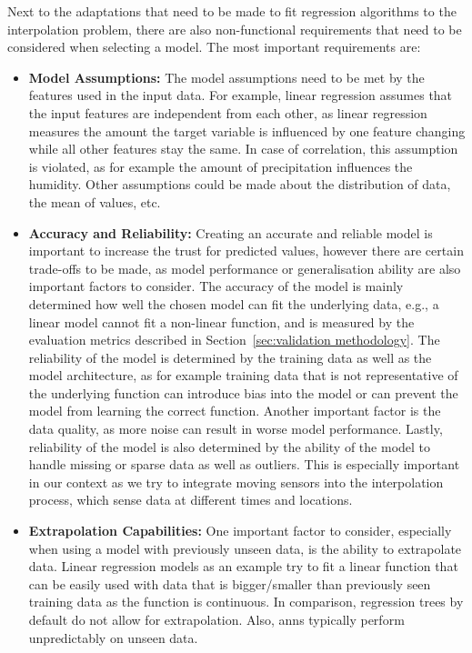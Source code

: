 Next to the adaptations that need to be made to fit regression algorithms to the interpolation problem, there are also non-functional requirements that need to be considered when selecting a model. The most important requirements are:

\begin{itemize}
    \item \textbf{Model Assumptions:} The model assumptions need to be met by the features used in the input data. For example, linear regression assumes that the input features are independent from each other, as linear regression measures the amount the target variable is influenced by one feature changing while all other features stay the same. In case of correlation, this assumption is violated, as for example the amount of precipitation influences the humidity. Other assumptions could be made about the distribution of data, the mean of values, etc.
    \item \textbf{Accuracy and Reliability:} Creating an accurate and reliable model is important to increase the trust for predicted values, however there are certain trade-offs to be made, as model performance or generalisation ability are also important factors to consider.
    The accuracy of the model is mainly determined how well the chosen model can fit the underlying data, e.g., a linear model cannot fit a non-linear function, and is measured by the evaluation metrics described in Section~\ref{sec:validation methodology}.
    The reliability of the model is determined by the training data as well as the model architecture, as for example training data that is not representative of the underlying function can introduce bias into the model or can prevent the model from learning the correct function. Another important factor is the data quality, as more noise can result in worse model performance. Lastly, reliability of the model is also determined by the ability of the model to handle missing or sparse data as well as outliers. This is especially important in our context as we try to integrate moving sensors into the interpolation process, which sense data at different times and locations.
    \item \textbf{Extrapolation Capabilities:} One important factor to consider, especially when using a model with previously unseen data, is the ability to extrapolate data. Linear regression models as an example try to fit a linear function that can be easily used with data that is bigger/smaller than previously seen training data as the function is continuous. In comparison, regression trees by default do not allow for extrapolation. Also, \gls{ann}s typically perform unpredictably on unseen data.

\end{itemize}
